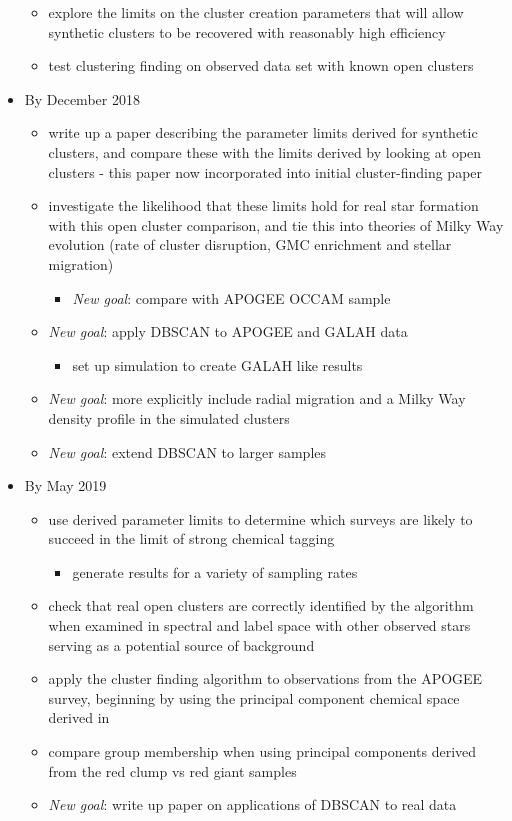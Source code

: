 \documentclass[11pt]{article}
\begin{document}
\begin{itemize}
\begin{itemize}
\item {\color{RoyalBlue} explore the limits on the cluster creation parameters that will allow synthetic clusters to be recovered with reasonably high efficiency}
\item {\color{RoyalBlue} test clustering finding on observed data set with known open clusters}
\end{itemize}
\item By December 2018
\begin{itemize}
\item {\color{BurntOrange} write up a paper describing the parameter limits derived for synthetic clusters, and compare these with the limits derived by looking at open clusters} - this paper now incorporated into initial cluster-finding paper
\item investigate the likelihood that these limits hold for real star formation with this open cluster comparison, and tie this into theories of Milky Way evolution (rate of cluster disruption, GMC enrichment and stellar migration)
\begin{itemize}
\item \emph{New goal}: compare with APOGEE OCCAM sample
\end{itemize}
\item \emph{New goal}: apply DBSCAN to APOGEE and GALAH data
\begin{itemize}
\item set up simulation to create GALAH like results
\end{itemize}
\item \emph{New goal}: more explicitly include radial migration and a Milky Way density profile in the simulated clusters
\item \emph{New goal}: extend DBSCAN to larger samples
\end{itemize}
\item By May 2019
\begin{itemize}
\item use derived parameter limits to determine which surveys are likely to succeed in the limit of strong chemical tagging
	\begin{itemize}
		\item {\color{ForestGreen} generate results for a variety of sampling rates}
	\end{itemize}
\item {\color{RoyalBlue} check that real open clusters are correctly identified by the algorithm when examined in spectral and label space with other observed stars serving as a potential source of background}
\item {\color{ForestGreen} apply the cluster finding algorithm to observations from the APOGEE survey, beginning by using the principal component chemical space derived in \citet{Price-Jones2018}}
\item {\color{ForestGreen} compare group membership when using principal components derived from the red clump vs red giant samples}
\item \emph{New goal}: write up paper on applications of DBSCAN to real data
\end{itemize} 
\end{itemize}
\end{document}
